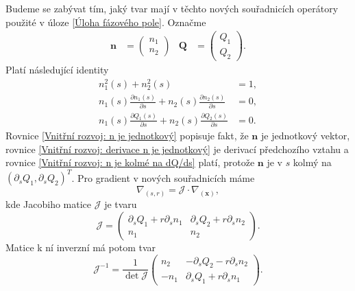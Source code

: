 Budeme se zabývat tím, jaký tvar mají v těchto nových souřadnicích operátory použité v úloze \eqref{Úloha fázového pole}.
Označme
\begin{align}
    \mathbf{n} &=
    \begin{pmatrix}
        n_1\\
        n_2
    \end{pmatrix} &
    \mathbf{Q} &= 
    \begin{pmatrix}
        Q_1\\
        Q_2
    \end{pmatrix}.
\end{align}
Platí následující identity
\begin{align}
    n_1^2(s) + n_2^2(s) &= 1,\label{Vnitřní rozvoj: n je jednotkový}\\
    n_1(s)\frac{\partial n_1(s)}{\partial s} + n_2(s)\frac{\partial n_2(s)}{\partial s} &= 0,\label{Vnitřní rozvoj: derivace n je jednotkový}\\
    n_1(s)\frac{\partial Q_1(s)}{\partial s} + n_2(s)\frac{\partial Q_2(s)}{\partial s} &= 0 \label{Vnitřní rozvoj: n je kolmé na dQ/ds}.
\end{align}
Rovnice \eqref{Vnitřní rozvoj: n je jednotkový} popisuje fakt, že \(\mathbf{n}\) je jednotkový vektor, rovnice \eqref{Vnitřní rozvoj: derivace n je jednotkový} je derivací předchozího vztahu a rovnice \eqref{Vnitřní rozvoj: n je kolmé na dQ/ds} platí, protože \(\mathbf{n}\) je v \(s\) kolmý na \((\partial_s Q_1, \partial_s Q_2)^T\).
Pro gradient v nových souřadnicích máme
\begin{equation}\label{Vnitřní rozvoj: gradient v souřadnicích s, r}
    \nabla_{(s, r)} = \mathcal{J} \cdot \nabla_{(\mathbf{x})},
\end{equation}
kde Jacobiho matice \(\mathcal{J}\) je tvaru
\begin{equation}
    \mathcal{J} =
    \begin{pmatrix}
        \partial_s Q_1 + r \partial_s n_1 & \partial_s Q_2 + r \partial_s n_2 \\
        n_1 & n_2
    \end{pmatrix}.
\end{equation}
Matice k ní inverzní má potom tvar
\begin{equation}\label{Vnitřní rozvoj: inverze J}
    \mathcal{J}^{-1} = \frac{1}{\det \mathcal{J}}
    \begin{pmatrix}
        n_2 & -\partial_s Q_2 - r \partial_s n_2 \\
        -n_1 & \partial_s Q_1 + r \partial_s n_1
    \end{pmatrix}.
\end{equation}
